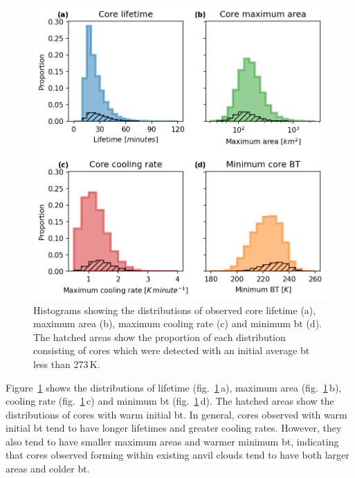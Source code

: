\begin{figure}[tp]
    \centering
    \includegraphics[width=\textwidth]{figures/ch2_09.png}
    \caption[
    Histograms showing the distributions of observed core properties
    ]{
    Histograms showing the distributions of observed core lifetime (a), maximum area (b), maximum cooling rate (c) and minimum \acrshort{bt} (d). The hatched areas show the proportion of each distribution consisting of cores which were detected with an initial average \acrshort{bt} less than 273\,\unit{K}.
    }
    \label{fig:core_properties}
\end{figure}

Figure~\ref{fig:core_properties} shows the distributions of lifetime (fig.~\ref{fig:core_properties}\,a), maximum area (fig.~\ref{fig:core_properties}\,b), cooling rate (fig.~\ref{fig:core_properties}\,c) and minimum \acrshort{bt} (fig.~\ref{fig:core_properties}\,d).
The hatched areas show the distributions of cores with warm initial \acrshort{bt}.
In general, cores observed with warm initial \acrshort{bt} tend to have longer lifetimes and greater cooling rates.
However, they also tend to have smaller maximum areas and warmer minimum \acrshort{bt}, indicating that cores observed forming within existing anvil clouds tend to have both larger areas and colder \acrshort{bt}.

